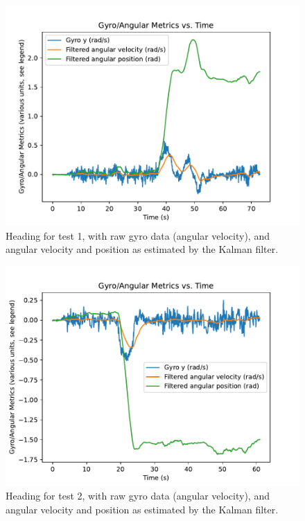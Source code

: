 \begin{figure}
	\centering
	\includegraphics[width=\linewidth]{./images/test1_yaw.pdf}
	\caption{Heading for test 1, with raw gyro data (angular velocity), and angular velocity and position as estimated by the Kalman filter.}
	\label{figure:test1_yaw}
\end{figure}

\begin{figure}
	\centering
	\includegraphics[width=\linewidth]{./images/test2_yaw.pdf}
	\caption{Heading for test 2, with raw gyro data (angular velocity), and angular velocity and position as estimated by the Kalman filter.}
	\label{figure:test2_yaw}
\end{figure}

